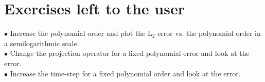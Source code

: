 \section{Exercises left to the user}
$\bullet$ Increase the polynomial order and plot the L$_{2}$ error vs. the polynomial order 
in a semilogarithmic scale. \\[1em]
$\bullet$ Change the projection operator for a fixed polynomial error and look at the error.\\[1em]
$\bullet$ Increase the time-step for a fixed polynomial order and look at the error.






